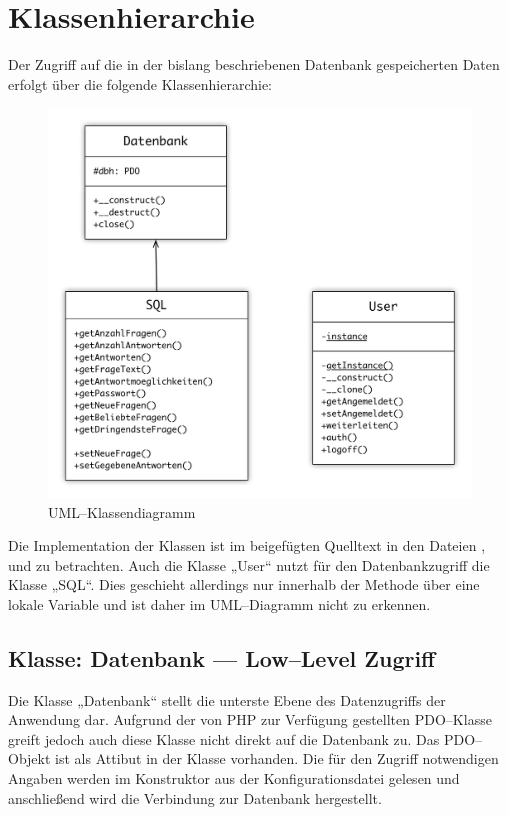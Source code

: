 \section{Klassenhierarchie}

Der Zugriff auf die in der bislang beschriebenen Datenbank gespeicherten Daten erfolgt über die folgende  Klassenhierarchie:

\begin{figure}[H]
\begin{center}
\includegraphics[width=\textwidth]{UML.jpg}
\caption{UML--Klassendiagramm}
\label{fig:uml}
\end{center}
\end{figure}

Die Implementation der Klassen ist im beigefügten Quelltext in den Dateien ,  und  zu betrachten. Auch die Klasse „User“ nutzt für den Datenbankzugriff die Klasse „SQL“. Dies geschieht allerdings nur innerhalb der Methode  über eine lokale Variable und ist daher im UML--Diagramm nicht zu erkennen.

\subsection{Klasse: Datenbank --- Low--Level Zugriff}

Die Klasse „Datenbank“ stellt die unterste Ebene des Datenzugriffs der Anwendung dar. Aufgrund der von PHP zur Verfügung gestellten PDO--Klasse greift jedoch auch diese Klasse nicht direkt auf die Datenbank  zu. Das PDO--Objekt ist als Attibut in der Klasse vorhanden. Die für den Zugriff notwendigen Angaben werden im Konstruktor aus der Konfigurationsdatei  gelesen und anschließend wird die Verbindung zur Datenbank hergestellt. 


